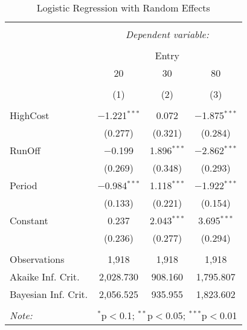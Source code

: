 \begin{table}[!htbp] \centering 
	\begin{tabular}{@{\extracolsep{5pt}}lccc} 
		\\[-1.8ex]\hline 
		\hline \\[-1.8ex] 
		& \multicolumn{3}{c}{\textit{Dependent variable:}} \\ 
		\cline{2-4} 
		\\[-1.8ex] & \multicolumn{3}{c}{Entry} \\ 
		& 20 & 30 & 80 \\ 
		\\[-1.8ex] & (1) & (2) & (3)\\ 
		\hline \\[-1.8ex] 
		HighCost & $-$1.221$^{***}$ & 0.072 & $-$1.875$^{***}$ \\ 
		& (0.277) & (0.321) & (0.284) \\ 
		RunOff & $-$0.199 & 1.896$^{***}$ & $-$2.862$^{***}$ \\ 
		& (0.269) & (0.348) & (0.293) \\ 
		Period & $-$0.984$^{***}$ & 1.118$^{***}$ & $-$1.922$^{***}$ \\ 
		& (0.133) & (0.221) & (0.154) \\ 
		Constant & 0.237 & 2.043$^{***}$ & 3.695$^{***}$ \\ 
		& (0.236) & (0.277) & (0.294) \\ 
		\hline \\[-1.8ex] 
		Observations & 1,918 & 1,918 & 1,918 \\ 
		Akaike Inf. Crit. & 2,028.730 & 908.160 & 1,795.807 \\ 
		Bayesian Inf. Crit. & 2,056.525 & 935.955 & 1,823.602 \\ 
		\hline 
		\hline \\[-1.8ex] 
		\textit{Note:}  & \multicolumn{3}{r}{$^{*}$p$<$0.1; $^{**}$p$<$0.05; $^{***}$p$<$0.01} \\ 
	\end{tabular} 
	\caption{Logistic Regression with Random Effects}
	\label{tab:logit_reg1} 
\end{table} 